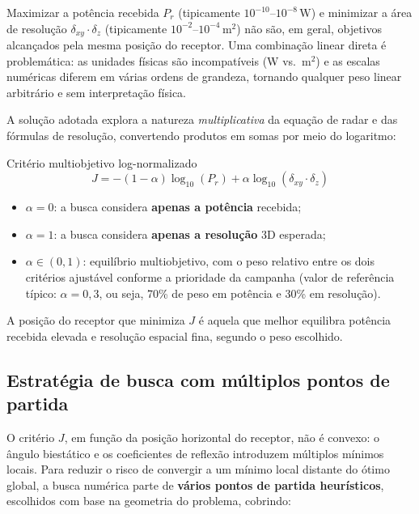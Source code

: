\documentclass[11pt,a4paper]{article}
\newcommand{\Prcv}{P_r}
\newcommand{\Jcost}{J}
\newcommand{\alphaR}{\alpha}
\newcommand{\dxy}{\delta_{xy}}
\newcommand{\dz}{\delta_z}
\begin{document}
Maximizar a potência recebida $\Prcv$ (tipicamente $10^{-10}$--$10^{-8}\,\text{W}$) e minimizar a
área de resolução $\dxy\cdot\dz$ (tipicamente $10^{-2}$--$10^{-4}\,\text{m}^2$) não são, em geral,
objetivos alcançados pela mesma posição do receptor. Uma combinação linear direta é problemática:
as unidades físicas são incompatíveis (W vs.\ m$^2$) e as escalas numéricas diferem em várias
ordens de grandeza, tornando qualquer peso linear arbitrário e sem interpretação física.

A solução adotada explora a natureza \emph{multiplicativa} da equação de radar e das fórmulas de
resolução, convertendo produtos em somas por meio do logaritmo:
\begin{resultado}{Critério multiobjetivo log-normalizado}
\[
\boxed{\Jcost = -(1-\alphaR)\log_{10}(\Prcv) + \alphaR\log_{10}(\dxy\cdot\dz)}
\]
\begin{itemize}[nosep]
  \item $\alphaR=0$: a busca considera \textbf{apenas a potência} recebida;
  \item $\alphaR=1$: a busca considera \textbf{apenas a resolução} 3D esperada;
  \item $\alphaR\in(0,1)$: equilíbrio multiobjetivo, com o peso relativo entre os dois critérios
  ajustável conforme a prioridade da campanha (valor de referência típico: $\alphaR=0{,}3$, ou
  seja, 70\% de peso em potência e 30\% em resolução).
\end{itemize}
A posição do receptor que minimiza $\Jcost$ é aquela que melhor equilibra potência recebida
elevada e resolução espacial fina, segundo o peso escolhido.
\end{resultado}

\subsection{Estratégia de busca com múltiplos pontos de partida}

O critério $\Jcost$, em função da posição horizontal do receptor, não é convexo: o ângulo
biestático e os coeficientes de reflexão introduzem múltiplos mínimos locais. Para reduzir o risco
de convergir a um mínimo local distante do ótimo global, a busca numérica parte de \textbf{vários
pontos de partida heurísticos}, escolhidos com base na geometria do problema, cobrindo:
\end{document}
